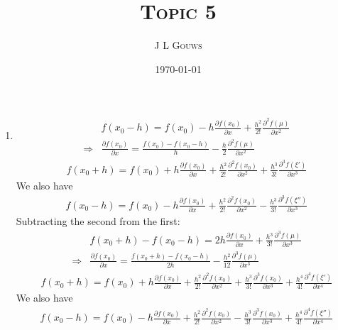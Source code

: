 \documentclass[12pt,a4]{article}
\title{
\textsc{Topic 5}
}
\author{\textsc{J L Gouws}
}
\date{\today
\\[1cm]}
\begin{document}
\thispagestyle{empty}

\maketitle

\begin{enumerate}
  \item
    \begin{align*}
                  & f(x_0 - h) = f(x_0) - h \frac{\partial f(x_0)}{\partial x} + \frac{h^2}{2!} \frac{\partial^2 f(\mu)}{\partial x^2}\\
      \Rightarrow & \frac{\partial f(x_0)}{\partial x} = \frac{f(x_0) - f(x_0 - h)}{h} - \frac{h}{2} \frac{\partial^2 f(\mu)}{\partial x^2}
    \end{align*}
    \begin{align*}
      f(x_0 + h) = f(x_0) + h \frac{\partial f(x_0)}{\partial x} + \frac{h^2}{2!} \frac{\partial^2 f(x_0)}{\partial x^2} + \frac{h^3}{3!} \frac{\partial^3 f(\xi')}{\partial x^3} 
    \end{align*}
    We also have
    \begin{align*}
      f(x_0 - h) = f(x_0) - h \frac{\partial f(x_0)}{\partial x} + \frac{h^2}{2!} \frac{\partial^2 f(x_0)}{\partial x^2} - \frac{h^3}{3!} \frac{\partial^3 f(\xi'')}{\partial x^3}
    \end{align*}
    Subtracting the second from the first:
    \begin{align*}
      & f(x_0 + h) - f(x_0 - h) = 2 h \frac{\partial f(x_0)}{\partial x} + \frac{h^3}{3!} \frac{\partial^3 f(\mu)}{\partial x^3} \\
      \Rightarrow & \frac{\partial f(x_0)}{\partial x} = \frac{f(x_0 + h) - f(x_0 - h)}{ 2 h}  - \frac{h^2}{12} \frac{\partial^3 f(\mu)}{\partial x^3} 
    \end{align*}
    \begin{align*}
      f(x_0 + h) = f(x_0) + h \frac{\partial f(x_0)}{\partial x} + \frac{h^2}{2!} \frac{\partial^2 f(x_0)}{\partial x^2} + \frac{h^3}{3!} \frac{\partial^3 f(x_0)}{\partial x^3} + \frac{h^4}{4!} \frac{\partial^4 f(\xi')}{\partial x^4}
    \end{align*}
    We also have
    \begin{align*}
      f(x_0 - h) = f(x_0) - h \frac{\partial f(x_0)}{\partial x} + \frac{h^2}{2!} \frac{\partial^2 f(x_0)}{\partial x^2} - \frac{h^3}{3!} \frac{\partial^3 f(x_0)}{\partial x^3} + \frac{h^4}{4!} \frac{\partial^4 f(\xi '')}{\partial x^4}
    \end{align*}

\end{enumerate}
\end{document}
